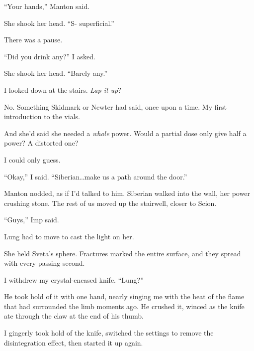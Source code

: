 ``Your hands,'' Manton said.



She shook her head.  ``S- superficial.''



There was a pause.



``Did you drink any?'' I asked.



She shook her head.  ``Barely any.''



I looked down at the stairs.  \emph{Lap it up}?



No.  Something Skidmark or Newter had said, once upon a time.  My first introduction to the vials.



And she'd said she needed a \emph{whole} power.  Would a partial dose only give half a power?  A distorted one?



I could only guess.



``Okay,'' I said.  ``Siberian\ldots make us a path around the door.''



Manton nodded, as if I'd talked to him.  Siberian walked into the wall, her power crushing stone.  The rest of us moved up the stairwell, closer to Scion.



``Guys,'' Imp said.



Lung had to move to cast the light on her.



She held Sveta's sphere.  Fractures marked the entire surface, and they spread with every passing second.



I withdrew my crystal-encased knife.  ``Lung?''



He took hold of it with one hand, nearly singing me with the heat of the flame that had surrounded the limb moments ago.  He crushed it, winced as the knife ate through the claw at the end of his thumb.



I gingerly took hold of the knife, switched the settings to remove the disintegration effect, then started it up again.




